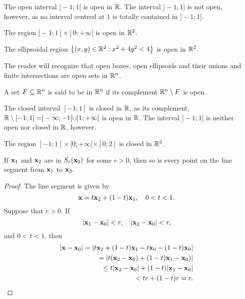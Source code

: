 \begin{exa}
The open interval $]-1; 1[$ is open in $\mathbb{R}$. The interval $]-1;
1]$ is not open, however, as no interval centred at $1$ is totally
contained in $]-1; 1]$.
\end{exa}\begin{exa}
The region  $]-1; 1[\times ]0; +\infty[$ is open in $\mathbb{R}^2$.
\end{exa}
\begin{exa}
The ellipsoidal region $\left\{(x,y)\in\mathbb{R}^2: x^2 + 4y^2 <
4\right\}$ is open in $\mathbb{R}^2$.
\end{exa}
The reader will recognize that open boxes, open ellipsoids and their
unions and finite intersections are open sets in $\mathbb{R}^n$.
\begin{df}
A set $F \subseteq \mathbb{R}^n$ is said to be 
in $\mathbb{R}^n$ if its complement $\mathbb{R}^n \setminus F$
is open.
\end{df}
\begin{exa}
The closed interval $[-1; 1]$ is closed in $\mathbb{R}$, as its
complement, $\mathbb{R} \setminus [-1;1] = ]-\infty; -1[\cup ]1;
+\infty[$ is open in $\mathbb{R}$. The interval $]-1; 1]$ is neither
open nor closed in $\mathbb{R}$, however.
\end{exa}\begin{exa}
The region  $[-1; 1]\times [0; +\infty[\times [0; 2]$ is closed in
$\mathbb{R}^3$.
\end{exa}

\begin{lemma}\label{thmtype:5.1.12}
If $\mathbf{ x}_1$ and $\mathbf{ x}_2$ are in $S_r(\mathbf{ x}_0)$ for some $r>0$,
then so is every point on
the line segment from $\mathbf{ x}_1$ to $\mathbf{ x}_2.$
\end{lemma}

\begin{proof}
The line segment is given by
$$
\mathbf{ x}=t\mathbf{ x}_2+(1-t)\mathbf{ x}_1,\quad 0<t<1.
$$
Suppose that $r>0$. If
$$
|\mathbf{ x}_1-\mathbf{ x}_0|<r,\quad |\mathbf{ x}_2-\mathbf{ x}_0|<r,
$$
and $0<t<1$, then
\begin{eqnarray*}
|\mathbf{ x}-\mathbf{ x}_0|=|t\mathbf{ x}_2+(1-t)\mathbf{ x}_1-t\mathbf{ x}_0-(1-t)\mathbf{ x}_0|\\
=|t(\mathbf{ x}_2-\mathbf{ x}_0)+(1-t)\mathbf{ x}_1-\mathbf{ x}_0)|\\
\le  t|\mathbf{ x}_2-\mathbf{ x}_0|+(1-t)|\mathbf{ x}_1-\mathbf{ x}_0|\\
< tr+(1-t)r=r.
\end{eqnarray*}
\end{proof}


